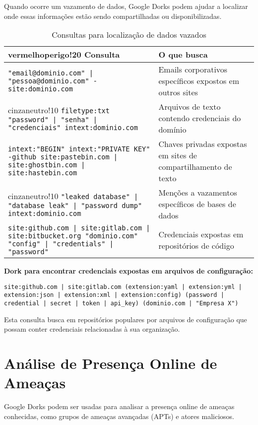 \documentclass[12pt,a4paper]{book}
\begin{document}
Quando ocorre um vazamento de dados, Google Dorks podem ajudar a localizar onde essas informações estão sendo compartilhadas ou disponibilizadas.

\begin{table}[h]
\centering
\begin{tabular}{|p{8cm}|p{7cm}|}
\hline
{vermelhoperigo!20} \textbf{Consulta} & \textbf{O que busca} \\
\hline
\texttt{"email@dominio.com" | "pessoa@dominio.com" -site:dominio.com} & Emails corporativos específicos expostos em outros sites \\
\hline
{cinzaneutro!10} \texttt{filetype:txt "password" | "senha" | "credenciais" intext:dominio.com} & Arquivos de texto contendo credenciais do domínio \\
\hline
\texttt{intext:"BEGIN" intext:"PRIVATE KEY" -github site:pastebin.com | site:ghostbin.com | site:hastebin.com} & Chaves privadas expostas em sites de compartilhamento de texto \\
\hline
{cinzaneutro!10} \texttt{"leaked database" | "database leak" | "password dump" intext:dominio.com} & Menções a vazamentos específicos de bases de dados \\
\hline
\texttt{site:github.com | site:gitlab.com | site:bitbucket.org "dominio.com" "config" | "credentials" | "password"} & Credenciais expostas em repositórios de código \\
\hline
\end{tabular}
\caption{Consultas para localização de dados vazados}
\end{table}

\begin{examplebox}
\textbf{Dork para encontrar credenciais expostas em arquivos de configuração:}

\texttt{site:github.com | site:gitlab.com (extension:yaml | extension:yml | extension:json | extension:xml | extension:config) (password | credential | secret | token | api\_key) (dominio.com | "Empresa X")}

Esta consulta busca em repositórios populares por arquivos de configuração que possam conter credenciais relacionadas à sua organização.
\end{examplebox}

\section{Análise de Presença Online de Ameaças}

Google Dorks podem ser usadas para analisar a presença online de ameaças conhecidas, como grupos de ameaças avançadas (APTs) e atores maliciosos.
\end{document}
